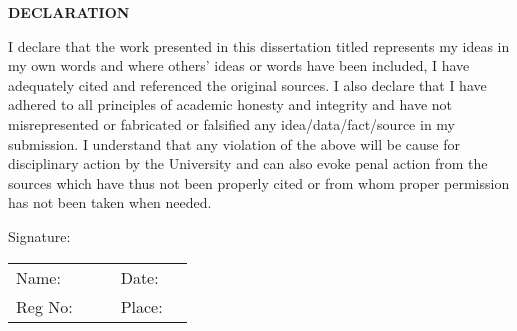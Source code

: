 \thispagestyle{empty}
\begin{center}
    \Large \bfseries  {DECLARATION} \\[1cm]
\end{center}

\vspace{2\baselineskip}
\noindent
{I declare that the work presented in this dissertation titled \textbf{\mytitle{}} represents my ideas in my own words and where others' ideas or words have been included, I have adequately cited and referenced the original sources. I also declare that I have adhered to all principles of academic honesty and integrity and have not misrepresented or fabricated or falsified any idea/data/fact/source in my submission. I understand that any violation of the above will be cause for disciplinary action by the University and can also evoke penal action from the sources which have thus not been properly cited or from whom proper permission has not been taken when needed.\par}

\vspace{3\baselineskip}
\noindent
{Signature:\par}

\vspace{3\baselineskip}

\noindent
    \begin{tabularx}{\textwidth}{@{}l l X l l}
        Name: &\myname{} &  &Date: &\mydate{} \mymonth{} \myyear{} \\
        Reg No: &\myregnum{} & &Place: &\myplace{}\\
    \end{tabularx}

  